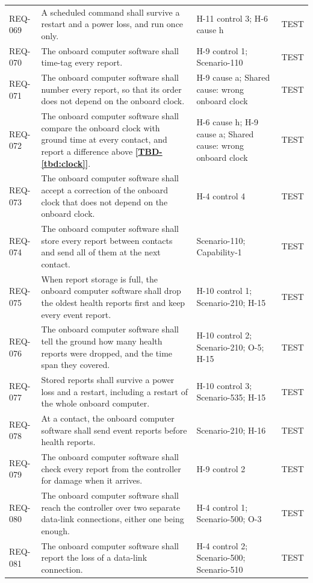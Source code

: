 \documentclass[11pt,a4paper]{article}
\newcommand{\tbd}[1]{\mbox{\textbf{[\hyperref[tbd:#1]{TBD-\ref*{tbd:#1}}]}}}
\begin{document}
{\begin{xltabular}{\textwidth}{@{}l>{\raggedright\arraybackslash}X>{\raggedright\arraybackslash}p{3.2cm}>{\raggedright\arraybackslash}p{3.0cm}@{}}
REQ-069 & A scheduled command shall survive a restart and a power loss, and run once only. & H-11 control 3; H-6 cause h & TEST \\
REQ-070 & The onboard computer software shall time-tag every report. & H-9 control 1; Scenario-110 & TEST \\
REQ-071 & The onboard computer software shall number every report, so that its order does not depend on the onboard clock. & H-9 cause a; Shared cause: wrong onboard clock & TEST \\
REQ-072 & The onboard computer software shall compare the onboard clock with ground time at every contact, and report a difference above \tbd{clock}. & H-6 cause h; H-9 cause a; Shared cause: wrong onboard clock & TEST \\
REQ-073 & The onboard computer software shall accept a correction of the onboard clock that does not depend on the onboard clock. & H-4 control 4 & TEST \\
REQ-074 & The onboard computer software shall store every report between contacts and send all of them at the next contact. & Scenario-110; Capability-1 & TEST \\
REQ-075 & When report storage is full, the onboard computer software shall drop the oldest health reports first and keep every event report. & H-10 control 1; Scenario-210; H-15 & TEST \\
REQ-076 & The onboard computer software shall tell the ground how many health reports were dropped, and the time span they covered. & H-10 control 2; Scenario-210; O-5; H-15 & TEST \\
REQ-077 & Stored reports shall survive a power loss and a restart, including a restart of the whole onboard computer. & H-10 control 3; Scenario-535; H-15 & TEST \\
REQ-078 & At a contact, the onboard computer software shall send event reports before health reports. & Scenario-210; H-16 & TEST \\
REQ-079 & The onboard computer software shall check every report from the controller for damage when it arrives. & H-9 control 2 & TEST \\
REQ-080 & The onboard computer software shall reach the controller over two separate data-link connections, either one being enough. & H-4 control 1; Scenario-500; O-3 & TEST \\
REQ-081 & The onboard computer software shall report the loss of a data-link connection. & H-4 control 2; Scenario-500; Scenario-510 & TEST \\

\end{xltabular}}
\end{document}

